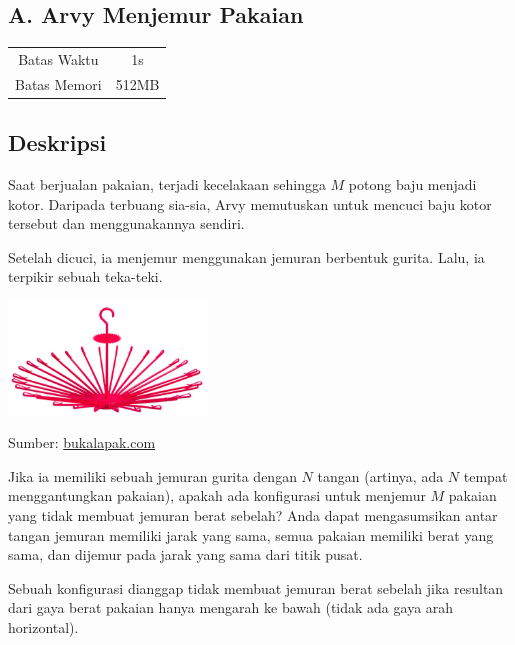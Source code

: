 \documentclass{article}
\begin{document}
\begin{center}
    \section*{A. Arvy Menjemur Pakaian}

    \begin{tabular}{ | c c | }
        \hline
        Batas Waktu  & 1s \\
        Batas Memori & 512MB \\
        \hline
    \end{tabular}
\end{center}

\subsection*{Deskripsi}

Saat berjualan pakaian, terjadi kecelakaan sehingga $M$ potong baju menjadi kotor.
Daripada terbuang sia-sia, Arvy memutuskan untuk mencuci baju kotor tersebut dan menggunakannya sendiri.

Setelah dicuci, ia menjemur menggunakan jemuran berbentuk gurita.
Lalu, ia terpikir sebuah teka-teki.

\begin{center}
\includegraphics[width=200px]{jemuran}

\footnotesize Sumber: \href{https://www.bukalapak.com/p/perlengkapan-bayi/perlengkapan-bayi-lainnya/9plhup-jual-jemuran-gantungan-baju-pakaian-bayi-lion-star-folding-hanger-30-sticks-besar-jemuran-gurita}{bukalapak.com}
\end{center}

Jika ia memiliki sebuah jemuran gurita dengan $N$ tangan (artinya, ada $N$ tempat menggantungkan pakaian), apakah ada konfigurasi untuk menjemur $M$ pakaian yang tidak membuat jemuran berat sebelah? Anda dapat mengasumsikan antar tangan jemuran memiliki jarak yang sama, semua pakaian memiliki berat yang sama, dan dijemur pada jarak yang sama dari titik pusat.

Sebuah konfigurasi dianggap tidak membuat jemuran berat sebelah jika resultan dari gaya berat pakaian hanya mengarah ke bawah (tidak ada gaya arah horizontal).
\end{document}
